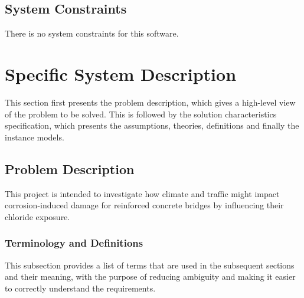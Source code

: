 \documentclass[12pt]{article}
\begin{document}
\subsection{System Constraints}
There is no system constraints for this software.
  
\section{Specific System Description}

This section first presents the problem description, which gives a high-level
view of the problem to be solved.  This is followed by the solution characteristics
specification, which presents the assumptions, theories, definitions and finally
the instance models.  

\subsection{Problem Description} \label{Sec_pd}
This project is intended to investigate how climate and traffic might impact corrosion-induced damage for reinforced concrete bridges by influencing their chloride exposure.

\subsubsection{Terminology and  Definitions}
This subsection provides a list of terms that are used in the subsequent
sections and their meaning, with the purpose of reducing ambiguity and making it
easier to correctly understand the requirements.
\end{document}

